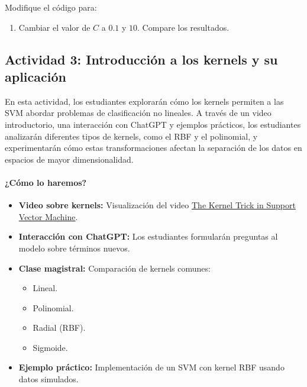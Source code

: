 \documentclass[a4,11pt]{aleph-notas}
\begin{document}
\begin{ejer}  
Modifique el código para:  
\begin{enumerate}[leftmargin=*]  
    \item Cambiar el valor de \( C \) a \( 0.1 \) y \( 10 \). Compare los resultados.  
\end{enumerate}  
\end{ejer}  

\subsection*{Actividad 3: Introducción a los kernels y su aplicación}  

En esta actividad, los estudiantes explorarán cómo los kernels permiten a las SVM abordar problemas de clasificación no lineales. A través de un video introductorio, una interacción con ChatGPT y ejemplos prácticos, los estudiantes analizarán diferentes tipos de kernels, como el RBF y el polinomial, y experimentarán cómo estas transformaciones afectan la separación de los datos en espacios de mayor dimensionalidad.

\paragraph{¿Cómo lo haremos?}  
\begin{itemize}[leftmargin=*]  
    \item \textbf{Video sobre kernels:}  
    Visualización del video \href{https://youtu.be/Q7vT0--5VII?si=lR6W66Cde65fEz1a}{The Kernel Trick in Support Vector Machine}.  
    \item \textbf{Interacción con ChatGPT:}  
    Los estudiantes formularán preguntas al modelo sobre términos nuevos.
    \item \textbf{Clase magistral:}  
    Comparación de kernels comunes:  
    \begin{itemize}  
        \item Lineal.  
        \item Polinomial.  
        \item Radial (RBF).  
        \item Sigmoide.  
    \end{itemize}  
    \item \textbf{Ejemplo práctico:}  
    Implementación de un SVM con kernel RBF usando datos simulados.  
\end{itemize}  
\end{document}

